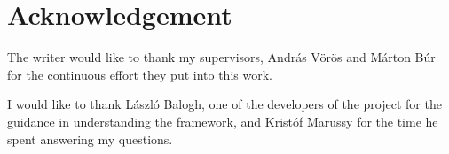\section{Acknowledgement}

The writer would like to thank my supervisors, {András Vörös} and {Márton Búr} for the continuous effort they put into this work.

I would like to thank {László Balogh}, one of the developers of the \viatrac{} project for the guidance in understanding the framework, and {Kristóf Marussy} for the time he spent answering my questions.
